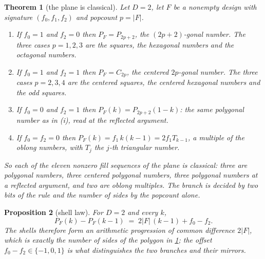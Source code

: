 \documentclass[11pt]{amsart}
\newtheorem{theorem}{Theorem}[section]
\newtheorem{proposition}[theorem]{Proposition}
\theoremstyle{definition}
\theoremstyle{remark}
\begin{document}
\begin{theorem}[the plane is classical]
\label{thm:plane}
Let $D = 2$, let $F$ be a nonempty design with signature $(f_{0},f_{1},f_{2})$ and popcount $p = |F|$.
\begin{enumerate}
\item[(i)] If $f_{0}=1$ and $f_{2}=0$ then $P_{F} = P_{2p+2}$, the $(2p+2)$-gonal number. The three cases $p = 1,2,3$ are the squares, the hexagonal numbers and the octagonal numbers.
\item[(ii)] If $f_{0}=1$ and $f_{2}=1$ then $P_{F} = C_{2p}$, the centered $2p$-gonal number. The three cases $p = 2,3,4$ are the centered squares, the centered hexagonal numbers and the odd squares.
\item[(iii)] If $f_{0}=0$ and $f_{2}=1$ then $P_{F}(k) = P_{2p+2}(1-k)$: the same polygonal number as in (i), read at the reflected argument.
\item[(iv)] If $f_{0}=f_{2}=0$ then $P_{F}(k) = f_{1}\,k(k-1) = 2f_{1}T_{k-1}$, a multiple of the oblong numbers, with $T_{j}$ the $j$-th triangular number.
\end{enumerate}
So each of the eleven nonzero fill sequences of the plane is classical: three are polygonal numbers, three centered polygonal numbers, three polygonal numbers at a reflected argument, and two are oblong multiples. The branch is decided by two bits of the rule and the number of sides by the popcount alone.
\end{theorem}

\begin{proposition}[shell law]
\label{prop:shell}
For $D = 2$ and every $k$,
\[
  P_{F}(k)-P_{F}(k-1) \;=\; 2|F|\,(k-1) + f_{0} - f_{2}.
\]
The shells therefore form an arithmetic progression of common difference $2|F|$, which is exactly the number of sides of the polygon in \cref{thm:plane}; the offset $f_{0}-f_{2} \in \{-1,0,1\}$ is what distinguishes the two branches and their mirrors.
\end{proposition}
\end{document}
